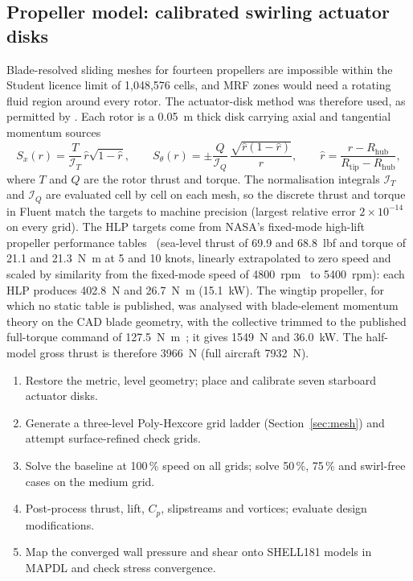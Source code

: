 \documentclass[10pt,a4paper]{article}
\begin{document}
\subsection{Propeller model: calibrated swirling actuator disks}
Blade-resolved sliding meshes for fourteen propellers are impossible within the Student licence limit of
1,048,576 cells, and MRF zones would need a rotating fluid region around every rotor. The actuator-disk method was
therefore used, as permitted by . Each rotor is a \SI{0.05}{m} thick disk
carrying axial and tangential momentum sources
\begin{equation}
  S_x(r) = \frac{T}{\mathcal{I}_T}\,\hat r\sqrt{1-\hat r}, \qquad
  S_\theta(r) = \pm\frac{Q}{\mathcal{I}_Q}\,\frac{\sqrt{\hat r(1-\hat r)}}{r}, \qquad
  \hat r = \frac{r-R_{\text{hub}}}{R_{\text{tip}}-R_{\text{hub}}},
  \label{eq:disk}
\end{equation}
where $T$ and $Q$ are the rotor thrust and torque. The normalisation integrals $\mathcal I_T$ and $\mathcal I_Q$ are
evaluated cell by cell on each mesh, so the discrete thrust and torque in Fluent match the targets to machine
precision (largest relative error $2\times10^{-14}$ on every grid). The HLP targets come from
NASA's fixed-mode high-lift propeller performance tables~\cite{nasa2024hlp} (sea-level thrust of 69.9 and
\SI{68.8}{lbf} and torque of 21.1 and \SI{21.3}{N.m} at 5 and 10 knots, linearly extrapolated to zero speed and
scaled by similarity from the fixed-mode speed of \SI{4800}{rpm}~\cite{nasa2024cruise} to \SI{5400}{rpm}): each HLP
produces \SI{402.8}{N} and \SI{26.7}{N.m} (\SI{15.1}{kW}). The wingtip propeller, for which no static table is
published, was analysed with blade-element momentum theory on the CAD blade geometry, with the collective trimmed
to the published full-torque command of \SI{127.5}{N.m}~\cite{nasa2024cruise}; it gives \SI{1549}{N} and
\SI{36.0}{kW}. The half-model gross thrust is therefore \SI{3966}{N} (full aircraft \SI{7932}{N}).

\begin{pipelinebox}[Workflow]
\begin{enumerate}[leftmargin=1.5em,itemsep=1.5pt,topsep=2pt]
  \item Restore the metric, level geometry; place and calibrate seven starboard actuator disks.
  \item Generate a three-level Poly-Hexcore grid ladder (Section~\ref{sec:mesh}) and attempt surface-refined check grids.
  \item Solve the baseline at 100\,\% speed on all grids; solve 50\,\%, 75\,\% and swirl-free cases on the medium grid.
  \item Post-process thrust, lift, $C_p$, slipstreams and vortices; evaluate design modifications.
  \item Map the converged wall pressure and shear onto SHELL181 models in MAPDL and check stress convergence.
\end{enumerate}
\end{pipelinebox}
\end{document}
